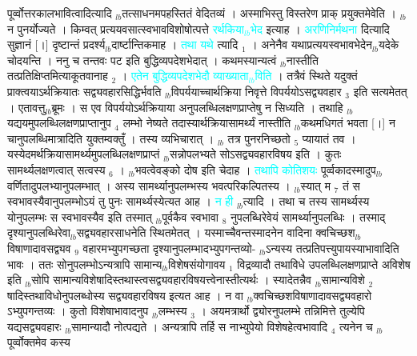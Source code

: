 \documentclass[article,12pt,a4paper]{memoir}%
\newcommand{\quotelemma}[1]{\textcolor{cyan}{#1}}
\begin{document}
पूर्व्वोत्तरकालभावित्वादित्यादि {\tiny $_{lb}$}तत्साधनमपहस्तितं वेदितव्यं । अस्माभिस्तु विस्तरेण प्राक् प्रयुक्तमेवेति । {\tiny $_{lb}$}न पुनर्योज्यते । किम्वत् प्रत्ययवसात्स्वभावविशोषोत्पत्ते \quotelemma{रर्थकिया{\tiny $_{lb}$}भेद} \cite[3b7]{vn-msN} इत्याह । \quotelemma{अरणिनिर्मथना} \cite[3b7]{vn-msN} दित्यादि सुज्ञानं [।] दृष्टान्तं प्रदर्श्य{\tiny $_{lb}$}दार्ष्टान्तिकमाह । \quotelemma{तथा यथे} \cite[3b8]{vn-msN} त्यादि {\tiny $_{1}$} । अनेनैव यथाप्रत्ययस्वभावभेदेन{\tiny $_{lb}$}यदेके चोदयन्ति । ननु च तन्तवः पट इति बुद्धिव्यपदेशभेदात् । कथमस्यान्यत्वं {\tiny $_{lb}$}नास्तीति तत्प्रतिक्षिप्तमित्याकूतवानाह {\tiny $_{2}$} । \quotelemma{एतेन बुद्धिव्यपदेशभेदौ व्याख्याता{\tiny $_{lb}$}विति} \cite[3b8]{vn-msN} । तत्रैवं स्थिते यदुक्तं प्राक्त्वयाऽर्थक्रियातः सद्व्यवहारसिद्धिर्भवति {\tiny $_{lb}$}विपर्ययाच्चार्थक्रिया निवृत्ते विपर्ययोऽसद्व्यवहार {\tiny $_{3}$} इति सत्यमेतत् । एतावत्तु{\tiny $_{lb}$}ब्रूमः । स एव विपर्ययोऽर्थक्रियाया अनुपलब्धिलक्षणप्राप्तेषु न सिध्यति । तथाहि {\tiny $_{lb}$}यद्ययमुपलब्धिलक्षणप्राप्तानुप {\tiny $_{4}$} लम्भो नेष्यते तदास्यार्थक्रियासामर्थ्यं नास्तीति {\tiny $_{lb}$}कथमधिगतं भवता [।] न चानुपलब्धिमात्रादिति युक्तम्वक्तुँ । तस्य व्यभिचारात् । {\tiny $_{lb}$} \leavevmode{} तत्र पुनरनिच्छतो {\tiny $_{5}$} प्यायातं तव । यस्येदमर्थक्रियासामर्थ्यमुपलब्धिलक्षणप्राप्तं {\tiny $_{lb}$}सन्नोपलभ्यते सोऽसद्व्यवहारविषय इति । कुतः सामर्थ्यलक्षणत्वात् सत्वस्य {\tiny $_{6}$} । {\tiny $_{lb}$}भवत्वेवङ्को दोष इति चेदाह । \quotelemma{तथापि कोतिशयः} \cite[3b10]{vn-msN} पूर्व्वकादस्मादुप{\tiny $_{lb}$}वर्णितादुपलभ्यानुपलम्भात् । अस्य सामर्थ्यानुपलम्भस्य भवत्परिकल्पितस्य । {\tiny $_{lb}$}स्यात् म {\tiny $_{7}$} तं स स्वभावस्यैवानुपलम्भोऽयं तु पुनः सामर्थ्यस्येत्यत आह । \quotelemma{न ही}\cite[3b10]{vn-msN} {\tiny $_{lb}$}त्यादि । तथा च तस्य सामर्थ्यस्य योनुपलम्भः स स्वभावस्यैव इति तस्मात् {\tiny $_{lb}$}पूर्वकैव स्वभावा {\tiny $_{8}$} नुपलब्धिरेवेयं सामर्थ्यानुपलब्धिः । तस्माद् दृश्यानुपलब्धिरेवा{\tiny $_{lb}$}सद्व्यवहारसाधनेति स्थितमेतत् । यस्माच्चैवन्तस्मादनेन वादिना क्वचिच्छश{\tiny $_{lb}$}विषाणादावसद्व्यव {\tiny $_{9}$} \leavevmode{} वहारमभ्युपगच्छता दृश्यानुपलम्भादभ्युपगन्तव्यो- {\tiny $_{lb}$}ऽन्यस्य तत्प्रतिपत्त्युपायस्याभावादिति भावः । ततः सोनुपलम्भोऽन्यत्रापि सामान्य{\tiny $_{lb}$}विशेषसंयोगावय {\tiny $_{1}$} विद्रव्यादौ तथाविधे उपलब्धिलक्षणप्राप्ते अविशेष इति {\tiny $_{lb}$}सोपि सामान्यविशेषादिस्तथास्त्वसद्व्यवहारविषयत्त्वेनास्तीत्यर्थः । स्यादेतन्नैव {\tiny $_{lb}$}सामान्यविशे {\tiny $_{2}$} षादिस्तथाविधोनुपलब्धोस्य सद्व्यवहारविषय इत्यत आह । न वा {\tiny $_{lb}$}क्वचिच्छशविषाणादावसद्व्यवहारो ऽभ्युपगन्तव्यः । कुतो विशेषाभावादनुप {\tiny $_{lb}$}लम्भस्य {\tiny $_{3}$} । अयमत्रार्थो द्व्योरनुपलम्भे तन्निमित्ते तुल्येपि यद्यसद्व्यवहारः {\tiny $_{lb}$}सामान्यादौ नोत्पद्यते । अन्यत्रापि तर्हि स नाभ्युपेयो विशेषहेत्वभावादि {\tiny $_{4}$} त्यनेन च {\tiny $_{lb}$}पूर्व्वोक्तमेव कस्य 
\end{document}
